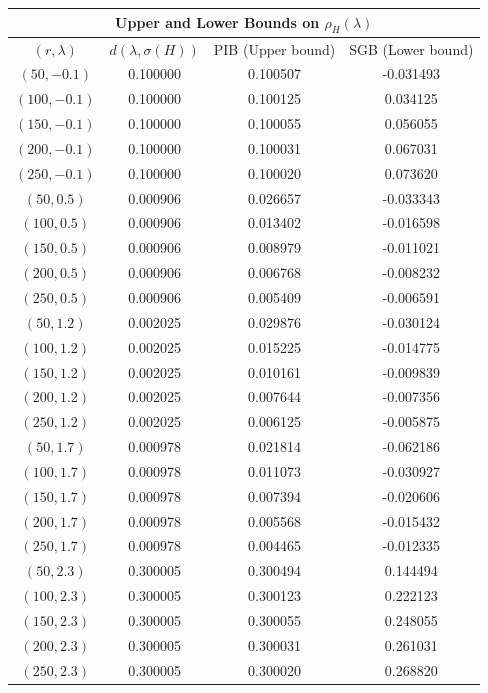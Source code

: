 \documentclass[11pt]{article}
\begin{document}
\begingroup
\begin{center}
    \begin{tabular}{ |c||c|c|c| }
        \hline
        \multicolumn{4}{|c|}{Upper and Lower Bounds on $\rho_H(\lambda)$} \\
        \hline
        $\left( r, \lambda \right)$ & $d\left(\lambda, \sigma(H)\right)$ & PIB (Upper bound) & SGB (Lower bound) \\
        \hline
        $(50, -0.1)$ & 0.100000 & 0.100507 & -0.031493 \\
        $(100, -0.1)$ & 0.100000 & 0.100125 & 0.034125 \\
        $(150, -0.1)$ & 0.100000 & 0.100055 & 0.056055 \\
        $(200, -0.1)$ & 0.100000 & 0.100031 & 0.067031 \\
        $(250, -0.1)$ & 0.100000 & 0.100020 & 0.073620 \\
        \hline
        $(50, 0.5)$ & 0.000906 & 0.026657 & -0.033343 \\
        $(100, 0.5)$ & 0.000906 & 0.013402 & -0.016598 \\
        $(150, 0.5)$ & 0.000906 & 0.008979 & -0.011021 \\
        $(200, 0.5)$ & 0.000906 & 0.006768 & -0.008232 \\
        $(250, 0.5)$ & 0.000906 & 0.005409 & -0.006591 \\
        \hline
        $(50, 1.2)$ & 0.002025 & 0.029876 & -0.030124 \\
        $(100, 1.2)$ & 0.002025 & 0.015225 & -0.014775 \\
        $(150, 1.2)$ & 0.002025 & 0.010161 & -0.009839 \\
        $(200, 1.2)$ & 0.002025 & 0.007644 & -0.007356 \\
        $(250, 1.2)$ & 0.002025 & 0.006125 & -0.005875 \\
        \hline
        $(50, 1.7)$ & 0.000978 & 0.021814 & -0.062186 \\
        $(100, 1.7)$ & 0.000978 & 0.011073 & -0.030927 \\
        $(150, 1.7)$ & 0.000978 & 0.007394 & -0.020606 \\
        $(200, 1.7)$ & 0.000978 & 0.005568 & -0.015432 \\
        $(250, 1.7)$ & 0.000978 & 0.004465 & -0.012335 \\
        \hline
        $(50, 2.3)$ & 0.300005 & 0.300494 & 0.144494 \\
        $(100, 2.3)$ & 0.300005 & 0.300123 & 0.222123 \\
        $(150, 2.3)$ & 0.300005 & 0.300055 & 0.248055 \\
        $(200, 2.3)$ & 0.300005 & 0.300031 & 0.261031 \\
        $(250, 2.3)$ & 0.300005 & 0.300020 & 0.268820 \\
        \hline
    \end{tabular}
\end{center}
\endgroup
\end{document}
